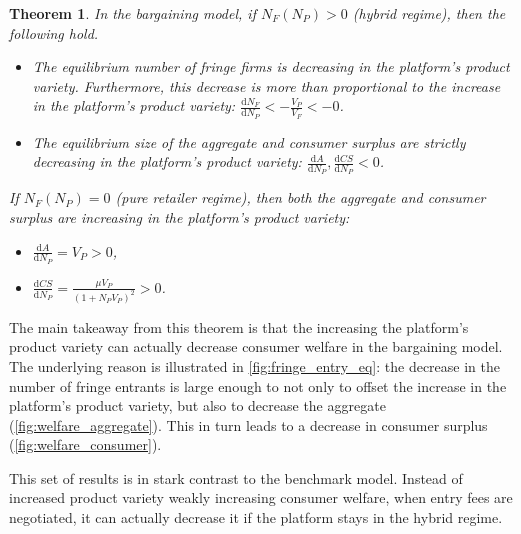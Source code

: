 \documentclass[a4paper]{article}
\newtheorem{theorem}{Theorem}
\newcommand{\dd}{\mathrm{d}}
\begin{document}
\begin{theorem}
    \label{prop:equilibrium_bargaining}
    In the bargaining model, if $N_F(N_P) > 0$ (hybrid regime), then the following hold.
    \begin{itemize}
        \item The equilibrium number of fringe firms is decreasing in the platform's product variety. Furthermore, this decrease is more than proportional to the increase in the platform's product variety: $\frac{\dd N_F}{\dd N_P} < -\frac{V_P}{V_F} < -0$.
        \item The equilibrium size of the aggregate and consumer surplus are strictly decreasing in the platform's product variety: $\frac{\dd A}{\dd N_P}, \frac{\dd CS}{\dd N_P} < 0$.
    \end{itemize}
    If $N_F(N_P) = 0$ (pure retailer regime), then both the aggregate and consumer surplus are increasing in the platform's product variety:
    \begin{itemize}
        \item $\frac{\dd A}{\dd N_P} = V_P > 0$,
        \item $\frac{\dd CS}{\dd N_P} = \frac{\mu V_P}{(1 + N_P V_P)^2} > 0$.
    \end{itemize}
\end{theorem}

The main takeaway from this theorem is that the increasing the platform's product variety can actually decrease consumer welfare in the bargaining model.
The underlying reason is illustrated in \cref{fig:fringe_entry_eq}: the decrease in the number of fringe entrants is large enough to not only to offset the increase in the platform's product variety, but also to decrease the aggregate (\cref{fig:welfare_aggregate}).
This in turn leads to a decrease in consumer surplus (\cref{fig:welfare_consumer}).

This set of results is in stark contrast to the benchmark model.
Instead of increased product variety weakly increasing consumer welfare, when entry fees are negotiated, it can actually decrease it if the platform stays in the hybrid regime.
\end{document}
